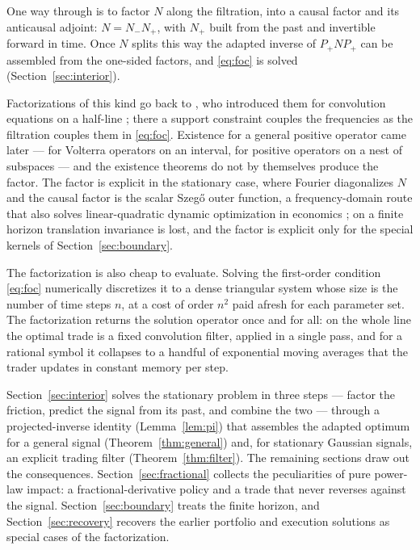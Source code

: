 \documentclass[11pt]{article}
\theoremstyle{plain}
\theoremstyle{definition}
\theoremstyle{remark}
\begin{document}
One way through is to factor $N$ along the filtration, into a causal factor and its anticausal adjoint: $N=N_-N_+$, with $N_+$ built from the past and invertible forward in time. Once $N$ splits this way the adapted inverse of $P_+NP_+$ can be assembled from the one-sided factors, and \eqref{eq:foc} is solved (Section~\ref{sec:interior}).

Factorizations of this kind go back to \citet{WienerHopf1931}, who introduced them for convolution equations on a half-line \citep{Krein1962,Noble1958}; there a support constraint couples the frequencies as the filtration couples them in \eqref{eq:foc}. Existence for a general positive operator came later --- \citet{GohbergKrein1970} for Volterra operators on an interval, \citet{Arveson1975} for positive operators on a nest of subspaces --- and the existence theorems do not by themselves produce the factor. The factor is explicit in the stationary case, where Fourier diagonalizes $N$ and the causal factor is the scalar Szeg\H{o} outer function, a frequency-domain route that also solves linear-quadratic dynamic optimization in economics \citep{Whiteman1985}; on a finite horizon translation invariance is lost, and the factor is explicit only for the special kernels of Section~\ref{sec:boundary}.

The factorization is also cheap to evaluate. Solving the first-order condition \eqref{eq:foc} numerically discretizes it to a dense triangular system whose size is the number of time steps $n$, at a cost of order $n^2$ paid afresh for each parameter set. The factorization returns the solution operator once and for all: on the whole line the optimal trade is a fixed convolution filter, applied in a single pass, and for a rational symbol it collapses to a handful of exponential moving averages that the trader updates in constant memory per step.

Section~\ref{sec:interior} solves the stationary problem in three steps --- factor the friction, predict the signal from its past, and combine the two --- through a projected-inverse identity (Lemma~\ref{lem:pi}) that assembles the adapted optimum for a general signal (Theorem~\ref{thm:general}) and, for stationary Gaussian signals, an explicit trading filter (Theorem~\ref{thm:filter}). The remaining sections draw out the consequences. Section~\ref{sec:fractional} collects the peculiarities of pure power-law impact: a fractional-derivative policy and a trade that never reverses against the signal. Section~\ref{sec:boundary} treats the finite horizon, and Section~\ref{sec:recovery} recovers the earlier portfolio and execution solutions as special cases of the factorization.
\end{document}
